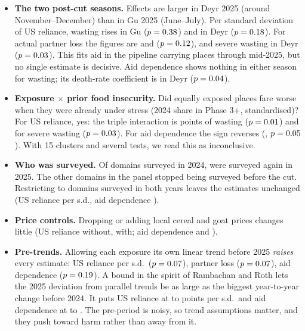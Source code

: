 \documentclass[11pt]{article}
\newcommand{\hd}[1]{\par\medskip{\sffamily\large\bfseries\color{navy}#1}\par}
\begin{document}
\hd{6. Further checks requested by the review}
\begin{itemize}
  \item \textbf{The two post-cut seasons.} Effects are larger in Deyr 2025 (around November--December) than in Gu 2025 (June--July). Per standard deviation of US reliance, wasting rises \nssBUsGamGu{} in Gu ($p=0.38$) and \nssBUsGamDeyr{} in Deyr ($p=0.18$). For actual partner loss the figures are \nssBLossGamGu{} and \nssBLossGamDeyr{} ($p=0.12$), and severe wasting in Deyr \nssBLossSamDeyr{} ($p=0.03$). This fits aid in the pipeline carrying places through mid-2025, but no single estimate is decisive. Aid dependence shows nothing in either season for wasting; its death-rate coefficient is \nssBIdxCdrDeyr{} in Deyr ($p=0.04$).
  \item \textbf{Exposure $\times$ prior food insecurity.} Did equally exposed places fare worse when they were already under stress (2024 share in Phase 3+, standardised)? For US reliance, yes: the triple interaction is \nsiBUsGamZS{} points of wasting ($p=0.01$) and \nsiBUsSamZS{} for severe wasting ($p=0.03$). For aid dependence the sign reverses (\nsiBIdxGamZS, $p=0.05$). With 15 clusters and several tests, we read this as inconclusive.
  \item \textbf{Who was surveyed.} Of \natTfour{} domains surveyed in 2024, \natObs{} were surveyed again in 2025. The other domains in the panel stopped being surveyed before the cut. Restricting to domains surveyed in both years leaves the estimates unchanged (US reliance \nrbBUsBal{} per s.d., aid dependence \nrbBIdxBal).
  \item \textbf{Price controls.} Dropping or adding local cereal and goat prices changes little (US reliance \nrbBUsMain{} without, \nrbBUsPrices{} with; aid dependence \nrbBIdxMain{} and \nrbBIdxPrices).
  \item \textbf{Pre-trends.} Allowing each exposure its own linear trend before 2025 \emph{raises} every estimate: US reliance \nrbBUsTrend{} per s.d.\ ($p=0.07$), partner loss \nrbBLossTrend{} ($p=0.07$), aid dependence \nrbBIdxTrend{} ($p=0.19$). A bound in the spirit of Rambachan and Roth lets the 2025 deviation from parallel trends be as large as the biggest year-to-year change before 2024. It puts US reliance at \nrmLoOneUs{} to \nrmHiOneUs{} points per s.d.\ and aid dependence at \nrmLoOneIdx{} to \nrmHiOneIdx. The pre-period is noisy, so trend assumptions matter, and they push toward harm rather than away from it.
\end{itemize}
\end{document}
